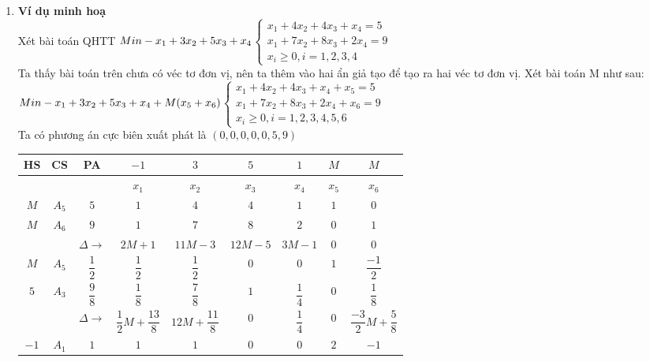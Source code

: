 \documentclass{article}
\begin{document}
\begin{enumerate}
                    \item \textbf{Ví dụ minh hoạ} \\
                    Xét bài toán QHTT $ Min -x_1+3x_2+5x_3+x_4\\
                    $$\begin{cases}x_1+4x_2+4x_3+x_4=5 \\ x_1+7x_2+8x_3+2x_4=9\\x_i\geq 0, i=1,2,3,4  \end{cases}$$ $\\
            Ta thấy bài toán trên chưa có véc tơ đơn vị, nên ta thêm vào hai ẩn giả tạo để tạo ra hai véc tơ đơn vị. Xét bài toán M như sau:\\
            $Min -x_1+3x_2+5x_3+x_4+M(x_5+x_6)\\
            $$\begin{cases} x_1+4x_2+4x_3+x_4+x_5=5\\x_1+7x_2+8x_3+2x_4+    x_6=9\\x_i\geq 0,i=1,2,3,4,5,6 \end{cases}$$ $\\
            Ta có phương án cực biên xuất phát là $(0,0,0,0,0,5,9)$
            \begin{center}
                \begin{tabular}{|c|c|c|c|c|c|c|c|c|}
                \hline
                HS&CS&PA&$-1$&$3$&$5$&$1$&$M$&$M$\\
                \hline
               &&& $x_1$&$x_2$&$x_3$&$x_4$&$x_5$&$x_6$\\
                \hline
                $M$&$A_5$&$5$&$1$&$4$&$4$&$1$&$1$&$0$\\
                \hline
                $M$&$A_6$&$9$&$1$&$7$&$8$&$2$&$0$&$1$\\
                \hline
              && $ \Delta\rightarrow$&$2M+1$&$11M-3$&$12M-5$&$3M-1$&$0$&$0$\\
               \hline
               $ M$&$A_5$&$\dfrac{1}{2}$&$\dfrac{1}{2}$&$\dfrac{1}{2}$&$0$&$0$&$1$&$\dfrac{-1}{2}$\\
               \hline
              $5$&$A_3$&$\dfrac{9}{8}$&$\dfrac{1}{8}$&$\dfrac{7}{8}$&$1$&$\dfrac{1}{4}$&$0$&$\dfrac{1}{8}$\\
              \hline
             &&$\Delta\rightarrow$&$\dfrac{1}{2}M+\dfrac{13}{8}$&$12M+\dfrac{11}{8}$&$0$&$\dfrac{1}{4}$&$0$&$\dfrac{-3}{2}M+\dfrac{5}{8}$\\
              \hline
              $-1$&$A_1$&$1$&$1$&$1$&$0$&$0$&$2$&$-1$\\

\end{tabular}
\end{center}
\end{enumerate}
\end{document}
